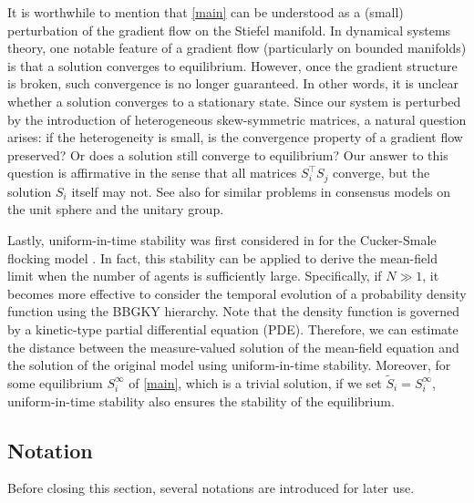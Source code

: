 \documentclass[11pt,reqno]{amsart}
\numberwithin{figure}{section}
\begin{document}
It is worthwhile to mention that \eqref{main} can be understood as a (small) perturbation of the gradient flow on the Stiefel manifold. In dynamical systems theory, one notable feature of a gradient flow (particularly on bounded manifolds) is that a solution converges to equilibrium. However, once the gradient structure is broken, such convergence is no longer guaranteed. In other words, it is unclear whether a solution converges to a stationary state. Since our system is perturbed by the introduction of heterogeneous skew-symmetric matrices, a natural question arises: if the heterogeneity is small, is the convergence property of a gradient flow preserved? Or does a solution still converge to equilibrium? Our answer to this question is affirmative in the sense that all matrices $S_i^\top S_j$ converge, but the solution $S_i$ itself may not. See also \cite{KP22} for similar problems in consensus models on the unit sphere and the unitary group.




Lastly, uniform-in-time stability was first considered in \cite{HKZ} for the Cucker-Smale flocking model \cite{C-S}. In fact, this stability can be applied to derive the mean-field limit when the number of agents is sufficiently large. Specifically, if $N \gg 1$, it becomes more effective to consider the temporal evolution of a probability density function using the BBGKY hierarchy. Note that the density function is governed by a kinetic-type partial differential equation (PDE). Therefore, we can estimate the distance between the measure-valued solution of the mean-field equation and the solution of the original model using uniform-in-time stability. Moreover, for some equilibrium ${S_i^\infty}$ of \eqref{main}, which is a trivial solution, if we set $\tilde{S}_i = S_i^\infty$, uniform-in-time stability also ensures the stability of the equilibrium.




\subsection{Notation}  
Before closing this section, several notations are introduced for later use.
\end{document}
